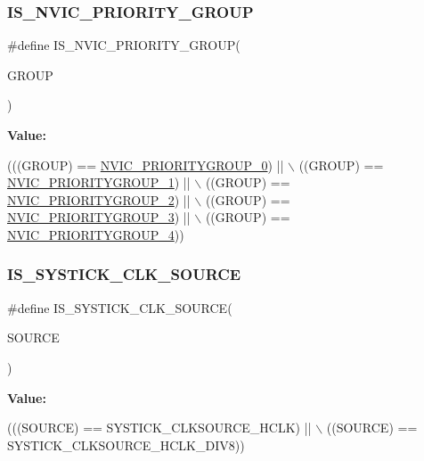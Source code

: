 \subsubsection{\texorpdfstring{I\+S\+\_\+\+N\+V\+I\+C\+\_\+\+P\+R\+I\+O\+R\+I\+T\+Y\+\_\+\+G\+R\+O\+UP}{IS\_NVIC\_PRIORITY\_GROUP}}
{\footnotesize\ttfamily \#define I\+S\+\_\+\+N\+V\+I\+C\+\_\+\+P\+R\+I\+O\+R\+I\+T\+Y\+\_\+\+G\+R\+O\+UP(\begin{DoxyParamCaption}\item[{}]{G\+R\+O\+UP }\end{DoxyParamCaption})}

{\bfseries Value\+:}
\begin{DoxyCode}
(((GROUP) == \hyperlink{group___c_o_r_t_e_x___preemption___priority___group_ga5e97dcff77680602c86e44f23f5ffa1a}{NVIC\_PRIORITYGROUP\_0}) || \(\backslash\)
                                       ((GROUP) == \hyperlink{group___c_o_r_t_e_x___preemption___priority___group_ga702227137b010421c3a3b6434005a132}{NVIC\_PRIORITYGROUP\_1}) || \(\backslash\)
                                       ((GROUP) == \hyperlink{group___c_o_r_t_e_x___preemption___priority___group_gaa43a3fd37850c120ce567ab2743d11b4}{NVIC\_PRIORITYGROUP\_2}) || \(\backslash\)
                                       ((GROUP) == \hyperlink{group___c_o_r_t_e_x___preemption___priority___group_ga8ddb24962e6f0fc3273139d45d374b09}{NVIC\_PRIORITYGROUP\_3}) || \(\backslash\)
                                       ((GROUP) == \hyperlink{group___c_o_r_t_e_x___preemption___priority___group_gae6eab9140204bc938255aa148e597c45}{NVIC\_PRIORITYGROUP\_4}))
\end{DoxyCode}
\mbox{\label{group___c_o_r_t_e_x___private___macros_ga22d6291f6aed29442cf4cd9098fa0784}} 
\subsubsection{\texorpdfstring{I\+S\+\_\+\+S\+Y\+S\+T\+I\+C\+K\+\_\+\+C\+L\+K\+\_\+\+S\+O\+U\+R\+CE}{IS\_SYSTICK\_CLK\_SOURCE}}
{\footnotesize\ttfamily \#define I\+S\+\_\+\+S\+Y\+S\+T\+I\+C\+K\+\_\+\+C\+L\+K\+\_\+\+S\+O\+U\+R\+CE(\begin{DoxyParamCaption}\item[{}]{S\+O\+U\+R\+CE }\end{DoxyParamCaption})}

{\bfseries Value\+:}
\begin{DoxyCode}
(((SOURCE) == SYSTICK\_CLKSOURCE\_HCLK) || \(\backslash\)
                                       ((SOURCE) == SYSTICK\_CLKSOURCE\_HCLK\_DIV8))
\end{DoxyCode}
